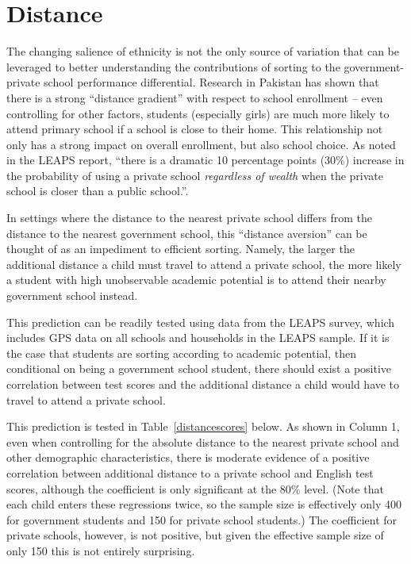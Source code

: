 \documentclass[12pt]{article}
\begin{document}
\section{Distance}\label{distance}
The changing salience of ethnicity is not the only source of variation that can be leveraged to better understanding the contributions of sorting to the government-private school performance differential. Research in Pakistan has shown that there is a strong ``distance gradient'' with respect to school enrollment -- even controlling for other factors, students (especially girls) are much more likely to attend primary school if a school is close to their home. This relationship not only has a strong impact on overall enrollment, but also school choice. As noted in the LEAPS report, ``there is a dramatic 10 percentage points (30\%) increase in the probability of using a private school \emph{regardless of wealth} when the private school is closer than a public school.''\citep[p.96]{Andrabi:2007we}. 

In settings where the distance to the nearest private school differs from the distance to the nearest government school, this ``distance aversion'' can be thought of as an impediment to efficient sorting. Namely, the larger the additional distance a child must travel to attend a private school, the more likely a student with high unobservable academic potential is to attend their nearby government school instead.  

This prediction can be readily tested using data from the LEAPS survey, which includes GPS data on all schools and households in the LEAPS sample. If it is the case that students are sorting according to academic potential, then conditional on being a government school student, there should exist a positive correlation between test scores and the additional distance a child would have to travel to attend a private school. 

This prediction is tested in Table~\ref{distancescores} below. As shown in Column 1, even when controlling for the absolute distance to the nearest private school and other demographic characteristics, there is moderate evidence of a positive correlation between additional distance to a private school and English test scores, although the coefficient is only significant at the 80\% level. (Note that each child enters these regressions twice, so the sample size is effectively only 400 for government students and 150 for private school students.) The coefficient for private schools, however, is not positive, but given the effective sample size of only 150 this is not entirely surprising. 
\end{document}
